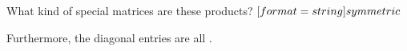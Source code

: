 \documentclass[handout]{ximera}
\begin{document}
\begin{exercise}
\begin{exercise}
\begin{exercise}
\begin{exercise}
What kind of special matrices are these products?  $[format=string]{symmetric}$

Furthermore, the diagonal entries are all 
. 

\end{exercise}
\end{exercise}
\end{exercise}
\end{exercise}
\end{document}
